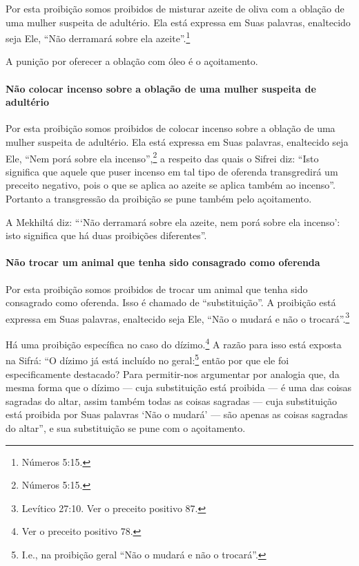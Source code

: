 Por esta proibição somos proibidos de misturar azeite de oliva com a
oblação de uma mulher suspeita de adultério. Ela está expressa em Suas
palavras, enaltecido seja Ele, ``Não derramará sobre ela azeite''.\footnote{Números 5:15.}

A punição por oferecer a oblação com óleo é o açoitamento.

\paragraph{Não colocar incenso sobre a oblação de uma mulher suspeita de adultério}

Por esta proibição somos proibidos de colocar incenso sobre a oblação
de uma mulher suspeita de adultério. Ela está expressa em Suas palavras,
enaltecido seja Ele, ``Nem porá sobre ela incenso'',\footnote{Números 5:15.} a
respeito das quais o Sifrei diz: ``Isto significa que aquele que puser
incenso em tal tipo de oferenda transgredirá um preceito negativo, pois
o que se aplica ao azeite se aplica também ao incenso''. Portanto a
transgressão da proibição se pune também pelo açoitamento.

A Mekhiltá diz: ```Não derramará sobre ela azeite, nem porá sobre ela
incenso': isto significa que há duas proibições diferentes''.

\paragraph{Não trocar um animal que tenha sido consagrado como oferenda}

Por esta proibição somos proibidos de trocar um animal que tenha sido
consagrado como oferenda. Isso é chamado de ``substituição''. A
proibição está expressa em Suas palavras, enaltecido seja Ele, ``Não o
mudará e não o trocará''.\footnote{Levítico 27:10. Ver o preceito positivo 87.}

Há uma proibição específica no caso do dízimo.\footnote{Ver o preceito positivo 78.} A
razão para isso está exposta na Sifrá: ``O dízimo já está incluído no
geral:\footnote{I.e., na proibição geral ``Não o mudará e não o trocará''.} então por que ele foi especificamente
destacado? Para permitir-nos argumentar por analogia que, da mesma forma
que o dízimo --- cuja substituição está proibida --- é uma das coisas
sagradas do altar, assim também todas as coisas sagradas --- cuja
substituição está proibida por Suas palavras `Não o mudará' --- são
apenas as coisas sagradas do altar'', e sua substituição se pune com o
açoitamento.

